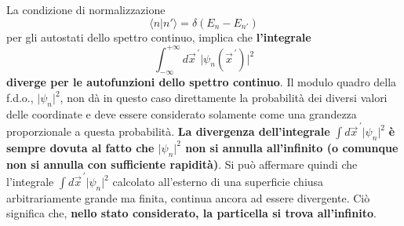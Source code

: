La condizione di normalizzazione
	\begin{equation}
		\langle n \vert n' \rangle = \delta (E_n - E_{n'})
	\end{equation}
per gli autostati dello spettro continuo, implica che \textbf{l'integrale}
	\begin{equation}
		\int _{- \infty} ^{+\infty} d{\vec{x}}^{\, \prime} \vert \psi _n ({\vec{x}}^{\, \prime}) \vert ^2
	\end{equation}
\textbf{diverge per le autofunzioni dello spettro continuo}. Il modulo quadro della f.d.o., $\vert \psi _n \vert ^2 $, non dà in questo caso direttamente la probabilità dei diversi valori delle coordinate e deve essere considerato solamente come una grandezza proporzionale a questa probabilità. \textbf{La divergenza dell'integrale} $ \int  d{\vec{x}}^{\, \prime} \vert \psi _n  \vert ^2$ \textbf{è sempre dovuta al fatto che $\vert \psi _n  \vert ^2$ non si annulla all'infinito (o comunque non si annulla con sufficiente rapidità)}. Si può affermare quindi che l'integrale $ \int  d{\vec{x}}^{\, \prime} \vert \psi _n  \vert ^2$ calcolato all'esterno di una superficie chiusa arbitrariamente grande ma finita, continua ancora ad essere divergente. Ciò significa che, \textbf{nello stato considerato, la particella si trova all'infinito}.\\

